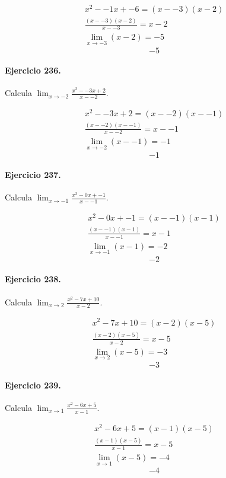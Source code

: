 \documentclass[11pt,a4paper]{article}
\begin{document}
\[
\begin{aligned}
x^2--1x+-6=(x--3)(x-2)\\
\frac{(x--3)(x-2)}{x--3}=x-2\\
\lim_{x\to -3}(x-2)=-5
\end{aligned}
\]
\[\boxed{-5}\]


\paragraph{Ejercicio 236.} Calcula $\displaystyle\lim_{x\to -2}\frac{x^2--3x+2}{x--2}$. 

\[
\begin{aligned}
x^2--3x+2=(x--2)(x--1)\\
\frac{(x--2)(x--1)}{x--2}=x--1\\
\lim_{x\to -2}(x--1)=-1
\end{aligned}
\]
\[\boxed{-1}\]


\paragraph{Ejercicio 237.} Calcula $\displaystyle\lim_{x\to -1}\frac{x^2-0x+-1}{x--1}$. 

\[
\begin{aligned}
x^2-0x+-1=(x--1)(x-1)\\
\frac{(x--1)(x-1)}{x--1}=x-1\\
\lim_{x\to -1}(x-1)=-2
\end{aligned}
\]
\[\boxed{-2}\]


\paragraph{Ejercicio 238.} Calcula $\displaystyle\lim_{x\to 2}\frac{x^2-7x+10}{x-2}$. 

\[
\begin{aligned}
x^2-7x+10=(x-2)(x-5)\\
\frac{(x-2)(x-5)}{x-2}=x-5\\
\lim_{x\to 2}(x-5)=-3
\end{aligned}
\]
\[\boxed{-3}\]


\paragraph{Ejercicio 239.} Calcula $\displaystyle\lim_{x\to 1}\frac{x^2-6x+5}{x-1}$. 

\[
\begin{aligned}
x^2-6x+5=(x-1)(x-5)\\
\frac{(x-1)(x-5)}{x-1}=x-5\\
\lim_{x\to 1}(x-5)=-4
\end{aligned}
\]
\[\boxed{-4}\]
\end{document}
